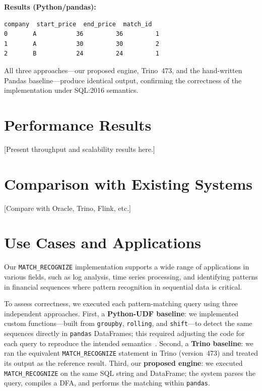 \noindent\textbf{Results (Python/pandas):}
\begin{lstlisting}[basicstyle=\ttfamily\small, backgroundcolor=\color{gray!10}]
  company  start_price  end_price  match_id
0       A           36         36         1
1       A           30         30         2
2       B           24         24         1
\end{lstlisting}

All three approaches---our proposed engine, Trino~473, and the
hand-written Pandas baseline---produce identical output, confirming
the correctness of the implementation under SQL:2016 semantics.

\section{Performance Results}
\label{sec:eval-performance}

[Present throughput and scalability results here.]

\section{Comparison with Existing Systems}
\label{sec:eval-comparison}

[Compare with Oracle, Trino, Flink, etc.]

\section{Use Cases and Applications}
\label{sec:eval-usecases}

Our \texttt{MATCH\_RECOGNIZE} implementation supports a wide range of
applications in various fields, such as log analysis, time series
processing, and identifying patterns in financial sequences where
pattern recognition in sequential data is critical.

To assess correctness, we executed each pattern-matching query using
three independent approaches.  First, a \textbf{Python-UDF baseline}:
we implemented custom functions---built from \texttt{groupby},
\texttt{rolling}, and \texttt{shift}---to detect the same sequences
directly in \texttt{pandas} DataFrames; this required adjusting the
code for each query to reproduce the intended
semantics~\cite{Python_UDF}.  Second, a \textbf{Trino baseline}: we
ran the equivalent \texttt{MATCH\_RECOGNIZE} statement in Trino
(version~473) and treated its output as the reference result.  Third,
our \textbf{proposed engine}: we executed \texttt{MATCH\_RECOGNIZE}
on the same SQL string and DataFrame; the system parses the query,
compiles a DFA, and performs the matching within \texttt{pandas}.

